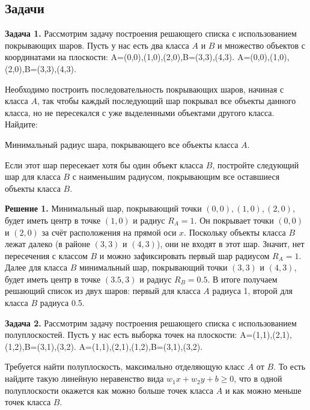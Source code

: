\subsection*{Задачи}

\textbf{Задача 1.} Рассмотрим задачу построения решающего списка с использованием покрывающих шаров. Пусть у нас есть два класса $A$ и $B$ и множество объектов с координатами на плоскости:
A={(0,0),(1,0),(2,0)},B={(3,3),(4,3)}.
A={(0,0),(1,0),(2,0)},B={(3,3),(4,3)}.

Необходимо построить последовательность покрывающих шаров, начиная с класса $A$, так чтобы каждый последующий шар покрывал все объекты данного класса, но не пересекался с уже выделенными объектами другого класса. Найдите:

    Минимальный радиус шара, покрывающего все объекты класса $A$.

    Если этот шар пересекает хотя бы один объект класса $B$, постройте следующий шар для класса $B$ с наименьшим радиусом, покрывающим все оставшиеся объекты класса $B$.

\textbf{Решение 1.}
Минимальный шар, покрывающий точки $(0,0), (1,0), (2,0)$, будет иметь центр в точке $(1,0)$ и радиус $R_A = 1$. Он покрывает точки $(0,0)$ и $(2,0)$ за счёт расположения на прямой оси $x$. Поскольку объекты класса $B$ лежат далеко (в районе $(3,3)$ и $(4,3)$), они не входят в этот шар. Значит, нет пересечения с классом $B$ и можно зафиксировать первый шар радиусом $R_A = 1$. Далее для класса $B$ минимальный шар, покрывающий точки $(3,3)$ и $(4,3)$, будет иметь центр в точке $(3.5, 3)$ и радиус $R_B = 0.5$. В итоге получаем решающий список из двух шаров: первый для класса $A$ радиуса 1, второй для класса $B$ радиуса 0.5.

\medskip

\textbf{Задача 2.} Рассмотрим задачу построения решающего списка с использованием полуплоскостей. Пусть у нас есть выборка точек на плоскости:
A={(1,1),(2,1),(1,2)},B={(3,1),(3,2)}.
A={(1,1),(2,1),(1,2)},B={(3,1),(3,2)}.

Требуется найти полуплоскость, максимально отделяющую класс $A$ от $B$. То есть найдите такую линейную неравенство вида $w_1 x + w_2 y + b \geq 0$, что в одной полуплоскости окажется как можно больше точек класса $A$ и как можно меньше точек класса $B$.

